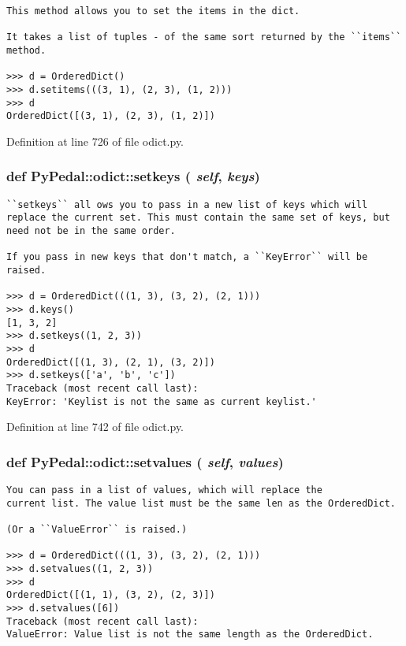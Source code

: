 \footnotesize\begin{verbatim}
This method allows you to set the items in the dict.

It takes a list of tuples - of the same sort returned by the ``items``
method.

>>> d = OrderedDict()
>>> d.setitems(((3, 1), (2, 3), (1, 2)))
>>> d
OrderedDict([(3, 1), (2, 3), (1, 2)])
\end{verbatim}
\normalsize
 

Definition at line 726 of file odict.py.\hypertarget{namespacePyPedal_1_1odict_48c25a95cf86cf14be594a700a693104}{
\subsubsection{\setlength{\rightskip}{0pt plus 5cm}def PyPedal::odict::setkeys ( {\em self},  {\em keys})}}
\label{namespacePyPedal_1_1odict_48c25a95cf86cf14be594a700a693104}




\footnotesize\begin{verbatim}
``setkeys`` all ows you to pass in a new list of keys which will
replace the current set. This must contain the same set of keys, but
need not be in the same order.

If you pass in new keys that don't match, a ``KeyError`` will be
raised.

>>> d = OrderedDict(((1, 3), (3, 2), (2, 1)))
>>> d.keys()
[1, 3, 2]
>>> d.setkeys((1, 2, 3))
>>> d
OrderedDict([(1, 3), (2, 1), (3, 2)])
>>> d.setkeys(['a', 'b', 'c'])
Traceback (most recent call last):
KeyError: 'Keylist is not the same as current keylist.'
\end{verbatim}
\normalsize
 

Definition at line 742 of file odict.py.\hypertarget{namespacePyPedal_1_1odict_ef95d6fcf3939c1fbda4257558609f4c}{
\subsubsection{\setlength{\rightskip}{0pt plus 5cm}def PyPedal::odict::setvalues ( {\em self},  {\em values})}}
\label{namespacePyPedal_1_1odict_ef95d6fcf3939c1fbda4257558609f4c}




\footnotesize\begin{verbatim}
You can pass in a list of values, which will replace the
current list. The value list must be the same len as the OrderedDict.

(Or a ``ValueError`` is raised.)

>>> d = OrderedDict(((1, 3), (3, 2), (2, 1)))
>>> d.setvalues((1, 2, 3))
>>> d
OrderedDict([(1, 1), (3, 2), (2, 3)])
>>> d.setvalues([6])
Traceback (most recent call last):
ValueError: Value list is not the same length as the OrderedDict.
\end{verbatim}
\normalsize
 

